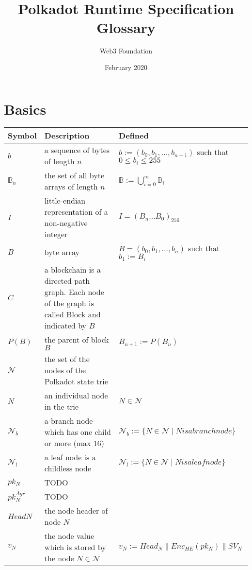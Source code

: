 \documentclass[11pt,a4paper]{article}
\begin{document}
\title{Polkadot Runtime Specification Glossary}
\author{Web3 Foundation}
\date{February 2020}
\maketitle
\section*{Basics}
\begin{center}
 \begin{tabulary}{1.5\textwidth}{LLL}
  \textbf{Symbol} & \textbf{Description} & \textbf{Defined} \\
  \hline
\(b\) &a sequence of bytes of length \(n\) & \(b:=(b_0,b_1,...,b_{n-1})\) such that \(0 \leq b_i \leq 255\) \\
\(\mathbb B_n\) &the set of all byte arrays of length \(n\) & \(\mathbb B:=\displaystyle\bigcup^\infty_{i=0} \mathbb B_i\) \\
\(I\) &little-endian representation of a non-negative integer& \(I=(B_n...B_0)_{256}\) \\
\(B\) &byte array& \(B = (b_0,b_1,...,b_n)\) such that \(b_1:=B_i\) \\
\(C\) &a blockchain is a directed path graph. Each node of the graph is called Block and indicated by \(B\) &\\
\(P(B)\) &the parent of block \(B\) & \(B_{n+1}:=P(B_n)\) \\
\(\mathcal N\) &the set of the nodes of the Polkadot state trie&\\
\(N\) &an individual node in the trie& \(N \in \mathcal N\) \\
\(\mathcal N_b\) &a branch node which has one child or more (max 16)& \(\mathcal N_b:=\{N \in \mathcal N \mid N is a branch node\}\) \\
\(\mathcal N_l\) &a leaf node is a childless node& \(\mathcal N_l:=\{N \in \mathcal N \mid N is a leaf node\}\) \\
\(pk_N\) &TODO&\\
\(pk^{Agr}_N\) &TODO&\\
\(HeadN\) &the node header of node \(N\) &\\
\(v_N\) &the node value which is stored by the node \(N \in \mathcal N\) & \(v_N := Head_N\parallel Enc_{HE}(pk_N)\parallel SV_N\) \\
 \end{tabulary}
\end{center}
\end{document}

